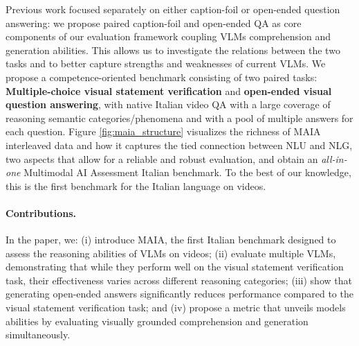 Previous work focused separately on either caption-foil or open-ended question answering: we propose paired caption-foil and open-ended QA as core components of our evaluation framework coupling VLMs comprehension and generation abilities. This allows us to investigate the relations between the two tasks and to better capture strengths and weaknesses of current VLMs. We propose a competence-oriented benchmark consisting of two paired tasks: \textbf{Multiple-choice visual statement verification} and \textbf{open-ended visual question answering}, with native Italian video QA with a large coverage of reasoning semantic categories/phenomena and with a pool of multiple answers for each question. Figure \ref{fig:maia_structure} visualizes the richness of MAIA interleaved data and how it captures the tied connection between NLU and NLG, two aspects   that allow for a reliable and robust evaluation, and obtain an \textit{all-in-one} Multimodal AI Assessment Italian benchmark. To the best of our knowledge, this is the first benchmark for the Italian language on videos. 


\paragraph{Contributions.} In the paper, we: (i) introduce MAIA, the first Italian benchmark designed to assess the reasoning abilities of VLMs on videos; (ii) evaluate multiple VLMs, demonstrating that while they perform well on the visual statement verification task, their effectiveness varies across different reasoning categories; (iii) show that generating open-ended answers significantly reduces performance compared to the visual statement verification task; and (iv) propose a metric that unveils models abilities by evaluating visually grounded comprehension and generation simultaneously.

\begin{comment}
Our experiments on  MAIA, show that VLMs: 
\begin{itemize}
\item  are able to avoid the trap of distributional LLM bias by grounding text on the visual input;
\item achieve high performance on challenging statement verification tasks; 
\item When the "severe" consistency metric is applied, their accuracy drops significantly
\end{itemize}
\end{comment}



